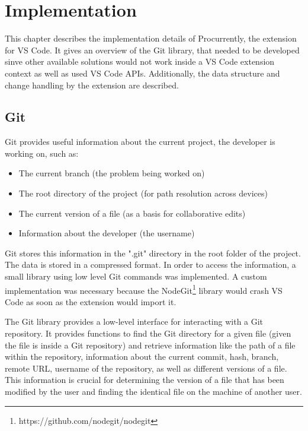 \chapter{Implementation}



This chapter describes the implementation details of Procurrently, the extension for VS Code. It gives an overview of the Git library, that needed to be developed sinve other available solutions would not work inside a VS Code extension context as well as used VS Code APIs. Additionally, the data structure and change handling by the extension are described.

\section{Git}

Git provides useful information about the current project, the developer is working on, such as:
\begin{itemize}
    \item The current branch (the problem being worked on)
    \item The root directory of the project (for path resolution across devices)
    \item The current version of a file (as a basis for collaborative edits)
    \item Information about the developer (the username)
\end{itemize}

Git stores this information in the ".git" directory in the root folder of the project.
The data is stored in a compressed format. In order to access the information, a small library using low level Git commands was implemented. 
A custom implementation was necessary because the NodeGit\footnote{https://github.com/nodegit/nodegit} library would crash VS Code as soon as the extension would import it.

The Git library provides a low-level interface for interacting with a Git repository. It provides functions to find the Git directory for a given file (given the file is inside a Git repository) and retrieve information like the path of a file within the repository, information about the current commit, hash, branch, remote URL, username of the repository, as well as different versions of a file. This information is crucial for determining the version of a file that has been modified by the user and finding the identical file on the machine of another user.

